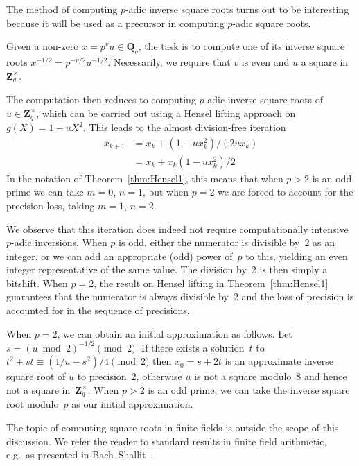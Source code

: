 The method of computing $p$-adic inverse square roots turns out 
to be interesting because it will be used as a precursor in computing 
$p$-adic square roots.

Given a non-zero $x = p^v u \in \mathbf{Q}_q$, the task is to compute 
one of its inverse square roots $x^{-1/2} = p^{-v/2} u^{-1/2}$.  Necessarily, 
we require that $v$ is even and $u$ a square in~$\mathbf{Z}_q^{\times}$.

The computation then reduces to computing $p$-adic inverse square 
roots of $u \in \mathbf{Z}_q^{\times}$, which can be carried out 
using a Hensel lifting approach on $g(X) = 1 - u X^2$.  This leads 
to the almost division-free iteration
\begin{equation}
\begin{split}
x_{k+1} & = x_k + (1 - u x_k^2) / (2 u x_k) \\
        & = x_k + x_k (1 - u x_k^2) / 2
\end{split}
\end{equation}
In the notation of Theorem~\ref{thm:Hensel1}, this means that when 
$p > 2$ is an odd prime we can take $m = 0$, $n = 1$, but when $p = 2$ 
we are forced to account for the precision loss, taking $m = 1$, $n = 2$.

We observe that this iteration does indeed not require computationally 
intensive $p$-adic inversions.  When $p$ is odd, either the numerator 
is divisible by~$2$ as an integer, or we can add an appropriate (odd) 
power of~$p$ to this, yielding an even integer representative of the 
same value.  The division by~$2$ is then simply a bitshift.  When $p = 2$, 
the result on Hensel lifting in Theorem~\ref{thm:Hensel1} guarantees that 
the numerator is always divisible by~$2$ and the loss of precision is 
accounted for in the sequence of precisions.

When $p = 2$, we can obtain an initial approximation as follows. 
Let $s = (u \bmod 2)^{-1/2} \pmod{2}$.  If there exists a solution~$t$ 
to $t^2 + s t \equiv (1/u - s^2) / 4 \pmod{2}$ then $x_0 = s + 2 t$ 
is an approximate inverse square root of $u$ to precision~$2$, 
otherwise $u$ is not a square modulo~$8$ and hence not a square 
in~$\mathbf{Z}_q^{\times}$.  When $p > 2$ is an odd prime, we can 
take the inverse square root modulo~$p$ as our initial approximation.

The topic of computing square roots in finite fields is outside 
the scope of this discussion.  We refer the reader to standard 
results in finite field arithmetic, e.g.\ as presented in 
Bach--Shallit~\citep{Bac96}.

